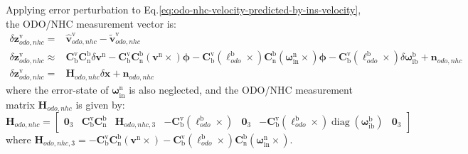\documentclass{article}
\begin{document}
Applying error perturbation to Eq.\eqref{eq:odo-nhc-velocity-predicted-by-ins-velocity}, the ODO/NHC measurement vector is:
\begin{equation}
    \begin{aligned}
    \delta \boldsymbol{z}_{odo,nhc}^{\mathrm{v}} =& \hat{\boldsymbol{v}}_{odo,nhc}^{\mathrm{v}} - \tilde{\boldsymbol{v}}_{odo,nhc}^{\mathrm{v}} \\ 
    \delta \boldsymbol{z}_{odo,nhc}^{\mathrm{v}} \approx &  \mathbf{C}_{\mathrm{b}}^{\mathrm{v}} \mathbf{C}_{\mathrm{n}}^{\mathrm{b}} \delta \boldsymbol{v}^{\mathrm{n}} - \mathbf{C}_{\mathrm{b}}^{\mathrm{v}} \mathbf{C}_{\mathrm{n}}^{\mathrm{b}} \left(\boldsymbol{v}^{\mathrm{n}} \times\right) \boldsymbol{\phi} - \mathbf{C}_{\mathrm{b}}^{\mathrm{v}} \left(\boldsymbol{\ell}_{odo}^{\mathrm{b}} \times \right) \mathbf{C}_{\mathrm{n}}^{\mathrm{b}} \left( \boldsymbol{\omega}_{\mathrm{in}}^{\mathrm{n}} \times \right) \boldsymbol{\phi} - \mathbf{C}_{\mathrm{b}}^{\mathrm{v}} \left(\boldsymbol{\ell}_{odo}^{\mathrm{b}} \times \right) \delta \boldsymbol{\omega}_{\mathrm{ib}}^{\mathrm{b}} + \boldsymbol{n}_{odo,nhc} \\
    \delta \boldsymbol{z}_{odo,nhc}^{\mathrm{v}} =& \boldsymbol{H}_{odo,nhc} \delta \boldsymbol{x} + \boldsymbol{n}_{odo,nhc}
    \end{aligned}
\end{equation}
where the error-state of $\boldsymbol{\omega}_{\mathrm{in}}^{\mathrm{n}}$ is also neglected, and the ODO/NHC measurement matrix $\boldsymbol{H}_{odo,nhc}$ is given by:
\begin{equation}
    \boldsymbol{H}_{odo,nhc} = \begin{bmatrix}
        \boldsymbol{0}_3 & \mathbf{C}_{\mathrm{b}}^{\mathrm{v}} \mathbf{C}_{\mathrm{n}}^{\mathrm{b}} & \boldsymbol{H}_{odo,nhc,3} & -\mathbf{C}_{\mathrm{b}}^{\mathrm{v}} \left(\boldsymbol{\ell}_{odo}^{\mathrm{b}} \times \right) & \boldsymbol{0}_3 & -\mathbf{C}_{\mathrm{b}}^{\mathrm{v}} \left(\boldsymbol{\ell}_{odo}^{\mathrm{b}} \times \right) \operatorname{diag}(\boldsymbol{\omega}_{\mathrm{ib}}^{\mathrm{b}}) & \boldsymbol{0}_3
    \end{bmatrix}
\end{equation}
where $\boldsymbol{H}_{odo,nhc,3} = - \mathbf{C}_{\mathrm{b}}^{\mathrm{v}} \mathbf{C}_{\mathrm{n}}^{\mathrm{b}} \left(\boldsymbol{v}^{\mathrm{n}} \times\right) - \mathbf{C}_{\mathrm{b}}^{\mathrm{v}} \left(\boldsymbol{\ell}_{odo}^{\mathrm{b}} \times \right) \mathbf{C}_{\mathrm{n}}^{\mathrm{b}} \left( \boldsymbol{\omega}_{\mathrm{in}}^{\mathrm{n}} \times \right)$.
\end{document}
